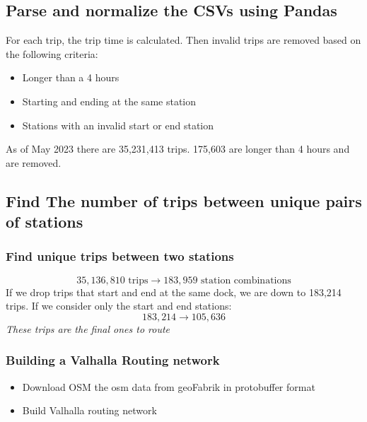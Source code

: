 \documentclass{beamer}
\begin{document}
\subsection{Parse and normalize the CSVs using Pandas}

\begin{frame}
    For each trip, the trip time is calculated. 
    Then invalid trips are removed based on the following criteria: 
    \begin{itemize}
        \item Longer than a 4 hours
              
              
        \item Starting and ending at the same station
              
              
        \item Stations with an invalid start or end station
              
    \end{itemize}
    As of May 2023 there are 35,231,413 trips. 175,603 are longer than 4 hours and are removed. 
\end{frame}

\subsection{Find The number of trips between unique pairs of stations}
\begin{frame}
    \frametitle{Find unique trips between two stations}
    $$ 35,136,810 \text{ trips} \rightarrow 183,959 \text{ station combinations} $$
    If we drop trips that start and end at the same dock, we are down to 183,214 trips.
    \smallskip
    If we consider only the start and end stations:
    $$ 183,214 \rightarrow 105,636 $$
    \emph{These trips are the final ones to route}
\end{frame}

\begin{frame}
    \frametitle{Building a Valhalla Routing network}
    \begin{itemize}
        \item Download OSM the osm data from geoFabrik in protobuffer format
        \item Build Valhalla routing network
    \end{itemize}
\end{frame}
\end{document}
